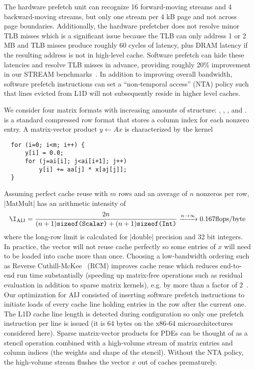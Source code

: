 The hardware prefetch unit can recognize 16 forward-moving streams and 4 backward-moving streams, but only one stream per 4 kB page and not across page boundaries.
Additionally, the hardware prefetcher does not resolve minor TLB misses which is a significant issue because the TLB can only address 1 or 2 MB and TLB misses produce roughly 60 cycles of latency, plus DRAM latency if the resulting address is not in high-level cache.
Software prefetch can hide these latencies and resolve TLB misses in advance, providing roughly 20\% improvement in our STREAM benchmarks~\cite{mccalpin2007stream}.
In addition to improving overall bandwidth, software prefetch instructions can set a ``non-temporal access'' (NTA) policy such that lines evicted from L1D will not subsequently reside in higher level caches.

We consider four matrix formats with increasing amounts of structure: \AIJ, \AIJInode, \BAIJ, and \SBAIJ.
\AIJ is a standard compressed row format that stores a column index for each nonzero entry.
A matrix-vector product $y \gets A x$ is characterized by the kernel
\begin{verbatim}
  for (i=0; i<m; i++) {
      y[i] = 0.0;
      for (j=ai[i]; j<ai[i+1]; j++)
          y[i] += aa[j] * x[aj[j]];
  }
\end{verbatim}
Assuming perfect cache reuse with $m$ rows and an average of $n$ nonzeros per row, \cverb|MatMult| has an arithmetic intensity of
\begin{align*}
  \I_{\text{AIJ}} = \frac{2n}{(n+1)\texttt{sizeof(Scalar)} + (n+1)\texttt{sizeof(Int)}} \xrightarrow{n\to\infty} 0.167 \text{flops/byte}
\end{align*}
where the long-row limit is calculated for \cverb|double| precision and 32 bit integers.
In practice, the vector will not reuse cache perfectly so some entries of $x$ will need to be loaded into cache more than once.
Choosing a low-bandwidth ordering such as Reverse Cuthill-McKee~\cite{cuthill1969reducing} (RCM) improves cache reuse which reduces end-to-end run time substantially (speeding up matrix-free operations such as residual evaluation in addition to sparse matrix kernels), e.g. by more than a factor of 2~\cite{gropp2000pmt}.
Our optimization for AIJ consisted of inserting software prefetch instructions to initiate loads of every cache line holding entries in the row after the current one.
The L1D cache line length is detected during configuration so only one prefetch instruction per line is issued (it is 64 bytes on the x86-64 microarchitectures considered here).
Sparse matrix-vector products for PDEs can be thought of as a stencil operation combined with a high-volume stream of matrix entries and column indices (the weights and shape of the stencil).
Without the NTA policy, the high-volume stream flushes the vector $x$ out of caches prematurely.


